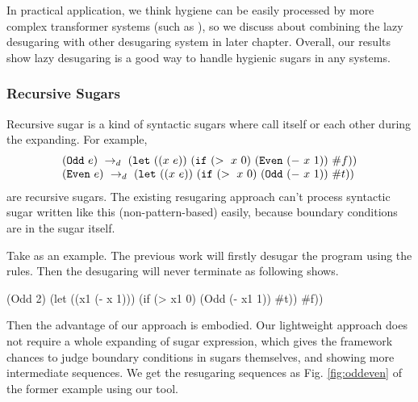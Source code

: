 In practical application, we think hygiene can be easily processed by more complex transformer systems (such as \cite{10.5555/1792878.1792884}), so we discuss about combining the lazy desugaring with other desugaring system in later chapter. Overall, our results show lazy desugaring is a good way to handle hygienic sugars in any systems.

\subsubsection{Recursive Sugars}
\label{sec:recursiveSugar}

Recursive sugar is a kind of syntactic sugars where call itself or each other during the expanding. For example,
\[
\begin{array}{l}
(\mbox{\tt Odd}~e) ~\rightarrow_d~ (\mbox{\tt let}~((x~e))~(\mbox{\tt if}~(>~x~0)~(\mbox{\tt Even}~(-~x~1))~\#f))\\
(\mbox{\tt Even}~e) ~\rightarrow_d~ (\mbox{\tt let}~((x~e))~(\mbox{\tt if}~(>~x~0)~(\mbox{\tt Odd}~(-~x~1))~\#t))
\end{array}
\]
are recursive sugars. The existing resugaring approach can't process syntactic sugar written like this (non-pattern-based) easily, because boundary conditions are in the sugar itself.

Take  as an example. The previous work will firstly desugar the program using the rules. Then the desugaring will never terminate as following shows.
\begin{footnotesize}
\begin{Codes}
   (Odd 2)
\qquad\quad(let ((x1 (- x 1))) (if (> x1 0) (Odd (- x1 1)) \#t))
\qquad\quad\#f))
\end{Codes}
\end{footnotesize}



Then the advantage of our approach is embodied. Our lightweight approach does not require a whole expanding of sugar expression, which gives the framework chances to judge boundary conditions in sugars themselves, and showing more intermediate sequences. We get the resugaring sequences as Fig.  \ref{fig:oddeven} of the former example using our tool.



